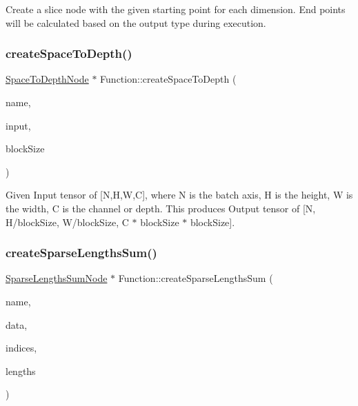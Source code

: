 Create a slice node with the given starting point for each dimension. End points will be calculated based on the output type during execution. \mbox{\label{classglow_1_1_function_aad17e40fffb4fe287d329c74a32256ea}} 
\subsubsection{\texorpdfstring{create\+Space\+To\+Depth()}{createSpaceToDepth()}}
{\footnotesize\ttfamily \hyperlink{classglow_1_1_space_to_depth_node}{Space\+To\+Depth\+Node} $\ast$ Function\+::create\+Space\+To\+Depth (\begin{DoxyParamCaption}\item[{llvm\+::\+String\+Ref}]{name,  }\item[{\hyperlink{structglow_1_1_node_value}{Node\+Value}}]{input,  }\item[{unsigned}]{block\+Size }\end{DoxyParamCaption})}

Given Input tensor of \mbox{[}N,H,W,C\mbox{]}, where N is the batch axis, H is the height, W is the width, C is the channel or depth. This produces Output tensor of \mbox{[}N, H/block\+Size, W/block\+Size, C $\ast$ block\+Size $\ast$ block\+Size\mbox{]}. \mbox{\label{classglow_1_1_function_a5dd07dd06c24d69113033f9ceb1135ed}} 
\subsubsection{\texorpdfstring{create\+Sparse\+Lengths\+Sum()}{createSparseLengthsSum()}}
{\footnotesize\ttfamily \hyperlink{classglow_1_1_sparse_lengths_sum_node}{Sparse\+Lengths\+Sum\+Node} $\ast$ Function\+::create\+Sparse\+Lengths\+Sum (\begin{DoxyParamCaption}\item[{llvm\+::\+String\+Ref}]{name,  }\item[{\hyperlink{structglow_1_1_node_value}{Node\+Value}}]{data,  }\item[{\hyperlink{structglow_1_1_node_value}{Node\+Value}}]{indices,  }\item[{\hyperlink{structglow_1_1_node_value}{Node\+Value}}]{lengths }\end{DoxyParamCaption})}


